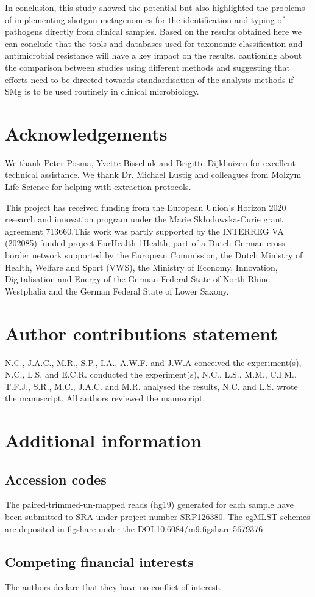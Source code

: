 In conclusion, this study showed the potential but also highlighted the problems of implementing shotgun metagenomics for the identification and typing of pathogens directly from clinical samples. Based on the results obtained here we can conclude that the tools and databases used for taxonomic classification and antimicrobial resistance will have a key impact on the results, cautioning about the comparison between studies using different methods and suggesting that efforts need to be directed towards standardisation of the analysis methods if SMg is to be used routinely in clinical microbiology.

\section{Acknowledgements}

We thank Peter Posma, Yvette Bisselink and Brigitte Dijkhuizen for excellent technical assistance. We thank Dr. Michael Lustig and colleagues from Molzym Life Science for helping with extraction protocols.

This project has received funding from the European Union’s Horizon 2020 research and innovation program under the Marie Skłodowska-Curie grant agreement 713660.This work was partly supported by the INTERREG VA (202085) funded project EurHealth-1Health, part of a Dutch-German cross-border network supported by the European Commission, the Dutch Ministry of Health, Welfare and Sport (VWS), the Ministry of Economy, Innovation, Digitalisation and Energy of the German Federal State of North Rhine-Westphalia and the German Federal State of Lower Saxony.

\section{Author contributions statement}

N.C., J.A.C., M.R., S.P., I.A., A.W.F. and J.W.A conceived the experiment(s), N.C., L.S. and E.C.R. conducted the experiment(s), N.C., L.S., M.M., C.I.M., T.F.J., S.R., M.C., J.A.C. and M.R. analysed the results, N.C. and L.S. wrote the manuscript. All authors reviewed the manuscript.

\section{Additional information}

\subsection{Accession codes}

The paired-trimmed-un-mapped reads (hg19) generated for each sample have been submitted to SRA under project number SRP126380. 
The cgMLST schemes are deposited in figshare under the DOI:10.6084/m9.figshare.5679376

\subsection{Competing financial interests}

The authors declare that they have no conflict of interest.